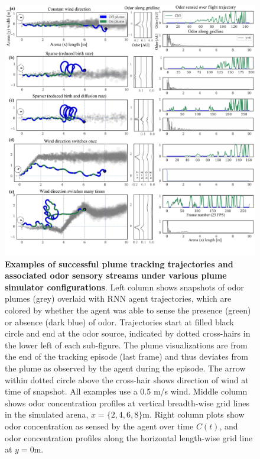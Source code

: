\documentclass[5p,twocolumn,authoryear]{elsarticle}
\begin{document}
\begin{figure}[h!]
\begin{center}
\includegraphics[width=1.0\linewidth]{fig_qual.pdf}
\caption{
\textbf{Examples of successful plume tracking trajectories and associated odor sensory streams under various plume simulator configurations}.  
Left column shows snapshots of odor plumes (grey)  overlaid with RNN agent trajectories, which are colored by whether the agent was able to sense the presence (green) or absence (dark blue) of odor. 
Trajectories start at filled black circle and end at the odor source, indicated by dotted cross-hairs in the lower left of each sub-figure.
The plume visualizations are from the end of the tracking episode (last frame) and thus deviates from the plume as observed by the agent during the episode.
The arrow within dotted circle above the cross-hair shows direction of wind at time of snapshot.
All examples use a 0.5 m/s wind. 
Middle column shows odor concentration profiles at vertical breadth-wise grid lines in the simulated arena, $x=\{2, 4, 6, 8\}$m.
Right column plots show odor concentration as sensed by the agent over time $C(t)$, and odor concentration profiles along the horizontal length-wise grid line at $y=0$m.
}
\end{center}
\end{figure}
\end{document}
